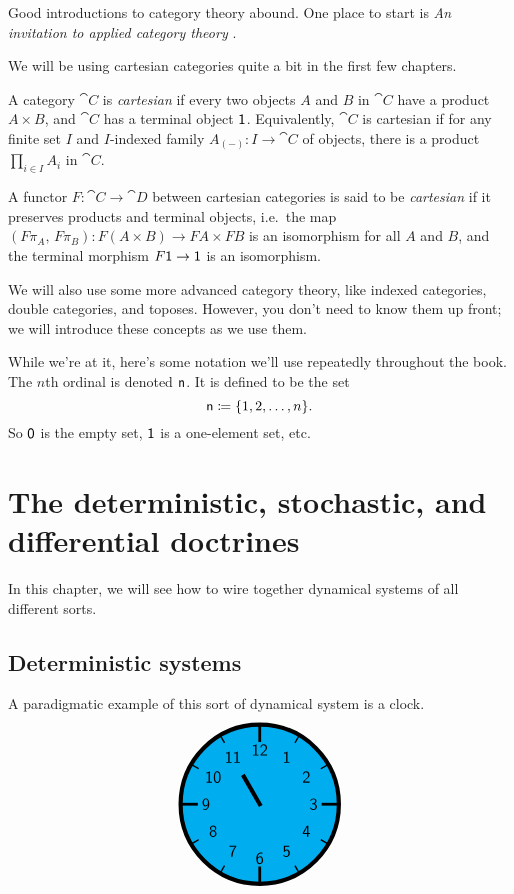 \documentclass[DynamicalBook]{subfiles}
\begin{document}
Good introductions to category theory abound. One place to start is \emph{An invitation to applied category theory} \cite{fong2019seven}.

We will be using cartesian categories quite a bit in the first few chapters.
\begin{definition}\label{def.cartesian_category}
  A category $\cat{C}$ is \emph{cartesian} if every two objects $A$ and $B$ in
  $\cat{C}$ have a product $A \times B$, and $\cat{C}$ has a terminal object
  $\mathsf{1}$. Equivalently, $\cat{C}$ is cartesian if for any finite set $I$ and
  $I$-indexed family $A_{(-)} : I \to \cat{C}$ of objects, there is a product
  $\prod_{i \in I} A_i$ in $\cat{C}$.

  A functor $F : \cat{C} \to \cat{D}$ between cartesian categories is said to be
  \emph{cartesian} if it preserves products and terminal objects, i.e.\ the
  map $(F\pi_A,\, F\pi_B) : F(A \times B) \to FA \times FB$ is an isomorphism
  for all $A$ and $B$, and the terminal morphism $F\mathsf{1} \to \mathsf{1}$ is an
  isomorphism. 
\end{definition}

We will also use some more advanced category theory, like indexed
categories, double categories, and toposes. However, you don't need to know them up front; we will introduce these concepts
as we use them.

While we're at it, here's some notation we'll use repeatedly throughout the book. The $n$th ordinal is denoted $\mathsf{n}$. It is defined to be the set
\[
\mathsf{n}\coloneqq\{1,2,\ldots,n\}.
\]
So $\mathsf{0}$ is the empty set, $\mathsf{1}$ is a one-element set, etc.

\section{The deterministic, stochastic, and differential doctrines}

In this chapter, we will see how to wire together dynamical systems of all
different sorts. 

\subsection{Deterministic systems}\label{sec.deterministic_system}



A paradigmatic example of this sort of dynamical system is a clock.
\[
\begin{tikzpicture}[line cap=rect,line width=3pt]
\filldraw [fill=cyan] (0,0) circle [radius=2cm];
\foreach \angle [count=\xi] in {60,30,...,-270}
{
  \draw[line width=1pt] (\angle:1.8cm) -- (\angle:2cm);
  \node[font=\large] at (\angle:1.36cm) {\textsf{\xi}};
}
\foreach \angle in {0,90,180,270}
  \draw[line width=2pt] (\angle:1.6cm) -- (\angle:2cm);
\draw (0,0) -- (120:0.8cm);
\end{tikzpicture}
\]
\end{document}
